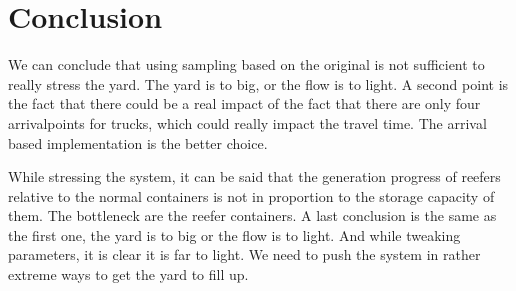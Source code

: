 \documentclass[]{article}
\begin{document}
\section{Conclusion}
We can conclude that using sampling based on the original is not sufficient to
really stress the yard. The yard is to big, or the flow is to light. A second
point is the fact that there could be a real impact of the fact that there are
only four arrivalpoints for trucks, which could really impact the travel time.
The arrival based implementation is the better choice.

While stressing the system, it can be said that the generation progress of
reefers relative to the normal containers is not in proportion to the storage
capacity of them. The bottleneck are the reefer containers. A last conclusion
is the same as the first one, the yard is to big or the flow is to light. And
while tweaking parameters, it is clear it is far to light. We need to push the
system in rather extreme ways to get the yard to fill up.
\end{document}
